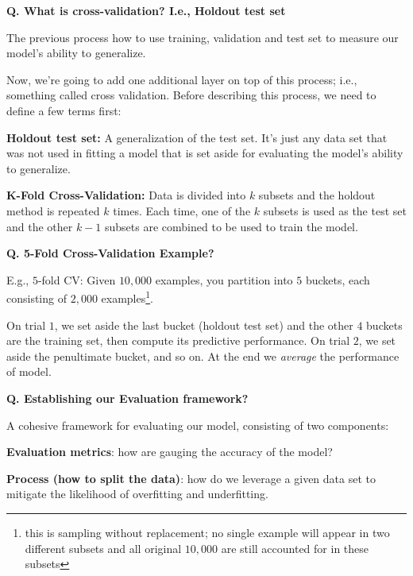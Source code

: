 \begin{frame}[fragile]{\textbf{Q. What is cross-validation? I.e., Holdout test set}}
  \begin{wideitemize}
    \item The previous process how to use training, validation and test set to measure
    our model's ability to generalize.
    \item Now, we're going to add one additional layer on top of this process;
    i.e., something called cross validation. Before describing this process, we need
    to define a few terms first:
    \begin{wideitemize}
      \item \textbf{Holdout test set:} A generalization of the test set. It's just any data set
      that was not used in fitting a model that is set aside for evaluating the model's ability
      to generalize.
      \item \textbf{K-Fold Cross-Validation:} Data is divided into $k$ subsets and the holdout method
      is repeated $k$ times. Each time, one of the $k$ subsets is used as the test set and the other
      $k - 1$ subsets are combined to be used to train the model.
    \end{wideitemize}
  \end{wideitemize}
\end{frame}

\begin{frame}[fragile]{\textbf{Q. 5-Fold Cross-Validation Example?}}
  \begin{wideitemize}
    \item E.g., $5$-fold CV: Given $10,000$ examples, you partition into $5$ buckets, each consisting
    of $2,000$ examples\footnote{this is sampling without replacement; no single example will appear
    in two different subsets and all original $10,000$ are still accounted for in these subsets}.
    \item On trial $1$, we set aside the last bucket (holdout test set) and the other $4$ buckets are the
    training set, then compute its predictive performance. On trial $2$, we set aside the penultimate
    bucket, and so on. At the end we \textit{average} the performance of model.
  \end{wideitemize}
\end{frame}

\begin{frame}[fragile]{\textbf{Q. Establishing our Evaluation framework?}}
  \begin{wideitemize}
    \item A cohesive framework for evaluating our model, consisting of two components:
    \begin{wideitemize}
      \item \textbf{Evaluation metrics}: how are gauging the accuracy of the model?
      \item \textbf{Process (how to split the data)}: how do we leverage a given
      data set to mitigate the likelihood of overfitting and underfitting.
    \end{wideitemize}
  \end{wideitemize}
\end{frame}

